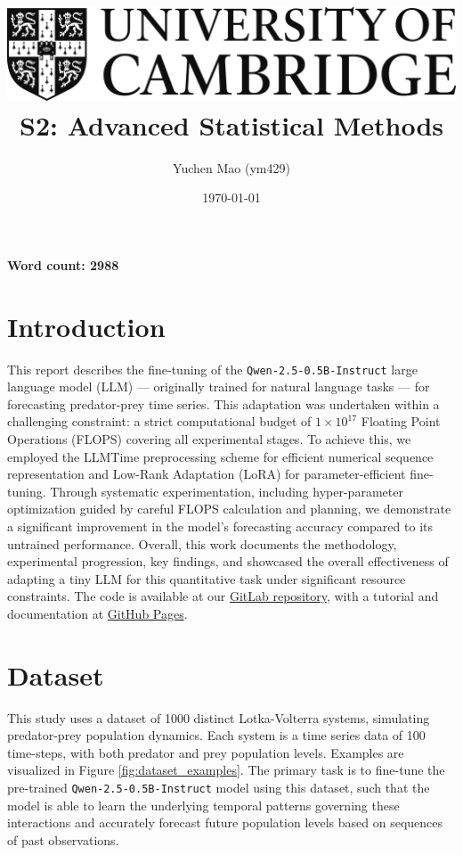\documentclass{article}
\title{
    \includegraphics[scale=0.2]{Images/cam_logo_bw.png}\\ %
    \vspace{0.5cm}
    S2: Advanced Statistical Methods
}
\author{Yuchen Mao (ym429)}
\affil{Department of Physics, University of Cambridge}
\date{\today}
\begin{document}
\maketitle
\noindent\textbf{Word count: 2988}
\tableofcontents
{}

\newpage


\section{Introduction}
\label{sec:introduction}

This report describes the fine-tuning of the \texttt{Qwen-2.5-0.5B-Instruct} large language model (LLM) — originally trained for natural language tasks — for forecasting predator-prey time series. This adaptation was undertaken within a challenging constraint: a strict computational budget of $1 \times 10^{17}$ Floating Point Operations (FLOPS) covering all experimental stages. To achieve this, we employed the LLMTime preprocessing scheme \cite{gruver2024largelanguagemodelszeroshot} for efficient numerical sequence representation and Low-Rank Adaptation (LoRA) \cite{hu2021loralowrankadaptationlarge} for parameter-efficient fine-tuning. Through systematic experimentation, including hyper-parameter optimization guided by careful FLOPS calculation and planning, we demonstrate a significant improvement in the model's forecasting accuracy compared to its untrained performance. Overall, this work documents the methodology, experimental progression, key findings, and showcased the overall effectiveness of adapting a tiny LLM for this quantitative task under significant resource constraints. The code is available at our \href{https://gitlab.developers.cam.ac.uk/phy/data-intensive-science-mphil/assessments/m2_coursework/ym429}{GitLab repository}, with a tutorial and documentation at \href{https://yuchen20.github.io/M2-Coursework/}{GitHub Pages}.

\section{Dataset}
\label{sec:dataset}

This study uses a dataset of 1000 distinct Lotka-Volterra systems, simulating predator-prey population dynamics. Each system is a time series data of 100 time-steps, with both predator and prey population levels. Examples are visualized in Figure \ref{fig:dataset_examples}. The primary task is to fine-tune the pre-trained \texttt{Qwen-2.5-0.5B-Instruct} model using this dataset, such that the model is able to learn the underlying temporal patterns governing these interactions and accurately forecast future population levels based on sequences of past observations.
\end{document}
